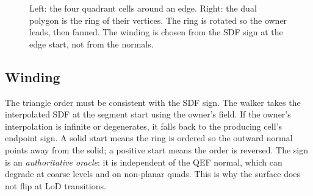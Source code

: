\begin{figure}[htbp]
\centering
{}
\caption{Left: the four quadrant cells around an edge.  Right: the dual
polygon is the ring of their vertices.  The ring is rotated so the owner
leads, then fanned.  The winding is chosen from the SDF sign at the edge
start, not from the normals.}
\label{fig:ring}
\end{figure}

\subsection{Winding}

The triangle order must be consistent with the SDF sign.  The walker takes
the interpolated SDF at the segment start using the owner's field.  If the
owner's interpolation is infinite or degenerates, it falls back to the
producing cell's endpoint sign.  A solid start means the ring is ordered
so the outward normal points away from the solid; a positive start means
the order is reversed.  The sign is an \emph{authoritative oracle}: it is
independent of the QEF normal, which can degrade at coarse levels and on
non-planar quads.  This is why the surface does not flip at LoD
transitions.


